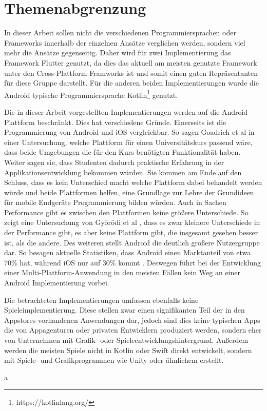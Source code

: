 \section{Themenabgrenzung}
\label{cha:3_3abgrenzung}
In dieser Arbeit sollen nicht die verschiedenen Programmiersprachen oder Frameworks innerhalb der einzelnen Ansätze verglichen werden, sondern viel mehr die Ansätze gegenseitig. Daher wird für zwei Implementierung das Framework Flutter genutzt, da dies das aktuell am meisten genutzte Framework\cite{statist_CP_Framework} unter den Cross-Plattform Framworks ist und somit einen guten Repräsentanten für diese Gruppe darstellt. Für die anderen beiden Implementierungen wurde die Android typische Programmiersprache Kotlin\footnote{https://kotlinlang.org/} genutzt. 

Die in dieser Arbeit vorgestellten Implementierungen werden auf die Android Plattform beschränkt. 
Dies hat verschiedene Gründe. Einerseits ist die Programmierung von Android und iOS vergleichbar.
So sagen Goadrich et al \cite{iOSvsAndroid} in einer Untersuchung, welche Plattform für einen Universitätskurs passend wäre, dass beide Umgebungen die für den Kurs benötigten Funktionalität haben.
Weiter sagen sie, dass Studenten dadurch praktische Erfahrung in der Applikationsentwicklung bekommen würden. Sie kommen am Ende auf den Schluss, dass es kein Unterschied macht welche Plattform dabei behandelt werden würde und beide Plattformen helfen, eine Grundlage zur Lehre der Grundideen für mobile Endgeräte Programmierung bilden würden.
Auch in Sachen Performance gibt es zwischen den Plattformen keine größere Unterschiede. So zeigt eine Untersuchung von Győrödi et al \cite{Android_IOS_Performance_comparison}, dass es zwar kleinere Unterschiede in der Performance gibt, es aber keine Plattform gibt, die insgesamt gesehen besser ist, als die andere.
Des weiteren stellt Android die deutlich größere Nutzergruppe dar. So besagen aktuelle Statistiken, dass Android einen Marktanteil von etwa 70\% hat, während iOS nur auf 30\% kommt \cite{statist_OS_worldwide}. Deswegen führt bei der Entwicklung einer Multi-Plattform-Anwendung in den meisten Fällen kein Weg an einer Android Implementierung vorbei.

Die betrachteten Implementierungen umfassen ebenfalls keine Spieleimplementierung. Diese stellen zwar einen signifikanten Teil der in den Appstores vorhandenen Anwendungen dar, jedoch sind dies keine typischen Apps die von Appagenturen oder privaten Entwicklern produziert werden, sondern eher von Unternehmen mit Grafik- oder Spieleentwicklungshintergrund. Außerdem werden die meisten Spiele nicht in Kotlin oder Swift direkt entwickelt, sondern mit Spiele- und Grafikprogrammen wie Unity oder ähnlichem erstellt.

a
